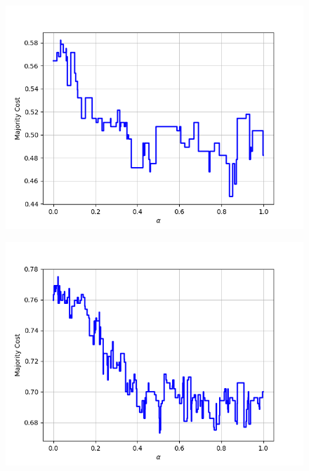\begin{figure}[h]
\begin{minipage}{.19\textwidth}
  {\includegraphics[width=\linewidth]{plots/omniglot-intra-ac-cnn/Bengali}}
\end{minipage}
\begin{minipage}{.19\textwidth}
  \centering
  {\includegraphics[width=\linewidth]{plots/omniglot-intra-ac-cnn/Blackfoot_(Canadian_Aboriginal_Syllabics)}}
\end{minipage}
\begin{minipage}{.19\textwidth}
  \centering

\end{minipage}
\end{figure}
